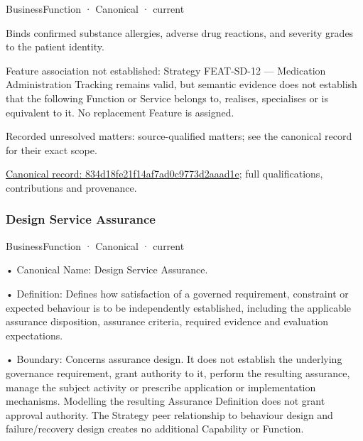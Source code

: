 \label{element:834d18fe21f14af7ad0c9773d2aaad1e}
{\small BusinessFunction · Canonical · current}\par

Binds confirmed substance allergies, adverse drug reactions, and severity grades to the patient identity.



Feature association not established: Strategy FEAT-SD-12 — Medication Administration Tracking remains valid, but semantic evidence does not establish that the following Function or Service belongs to, realises, specialises or is equivalent to it. No replacement Feature is assigned.


{\small Recorded unresolved matters: source-qualified matters; see the canonical record for their exact scope.}\par
{\footnotesize \href{../../../../continuum/business/business-function/834d18fe21f14af7ad0c9773d2aaad1e.md}{Canonical record: 834d18fe21f14af7ad0c9773d2aaad1e}; full qualifications, contributions and provenance.}\par
\subsubsection{Design Service Assurance}

\label{element:6668aa8daf964fec93fce42d48b37ad1}
{\small BusinessFunction · Canonical · current}\par

•
Canonical Name: Design Service Assurance.



•
Definition: Defines how satisfaction of a governed requirement, constraint or expected behaviour is to be independently established, including the applicable assurance disposition, assurance criteria, required evidence and evaluation expectations.



•
Boundary: Concerns assurance design. It does not establish the underlying governance requirement, grant authority to it, perform the resulting assurance, manage the subject activity or prescribe application or implementation mechanisms. Modelling the resulting Assurance Definition does not grant approval authority. The Strategy peer relationship to behaviour design and failure/recovery design creates no additional Capability or Function.



